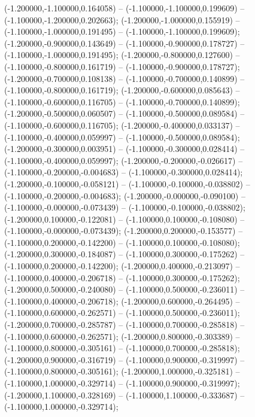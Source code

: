  (-1.200000,-1.100000,0.164058) -- (-1.100000,-1.100000,0.199609) -- (-1.100000,-1.200000,0.202663);
 (-1.200000,-1.000000,0.155919) -- (-1.100000,-1.000000,0.191495) -- (-1.100000,-1.100000,0.199609);
 (-1.200000,-0.900000,0.143649) -- (-1.100000,-0.900000,0.178727) -- (-1.100000,-1.000000,0.191495);
 (-1.200000,-0.800000,0.127600) -- (-1.100000,-0.800000,0.161719) -- (-1.100000,-0.900000,0.178727);
 (-1.200000,-0.700000,0.108138) -- (-1.100000,-0.700000,0.140899) -- (-1.100000,-0.800000,0.161719);
 (-1.200000,-0.600000,0.085643) -- (-1.100000,-0.600000,0.116705) -- (-1.100000,-0.700000,0.140899);
 (-1.200000,-0.500000,0.060507) -- (-1.100000,-0.500000,0.089584) -- (-1.100000,-0.600000,0.116705);
 (-1.200000,-0.400000,0.033137) -- (-1.100000,-0.400000,0.059997) -- (-1.100000,-0.500000,0.089584);
 (-1.200000,-0.300000,0.003951) -- (-1.100000,-0.300000,0.028414) -- (-1.100000,-0.400000,0.059997);
 (-1.200000,-0.200000,-0.026617) -- (-1.100000,-0.200000,-0.004683) -- (-1.100000,-0.300000,0.028414);
 (-1.200000,-0.100000,-0.058121) -- (-1.100000,-0.100000,-0.038802) -- (-1.100000,-0.200000,-0.004683);
 (-1.200000,-0.000000,-0.090100) -- (-1.100000,-0.000000,-0.073439) -- (-1.100000,-0.100000,-0.038802);
 (-1.200000,0.100000,-0.122081) -- (-1.100000,0.100000,-0.108080) -- (-1.100000,-0.000000,-0.073439);
 (-1.200000,0.200000,-0.153577) -- (-1.100000,0.200000,-0.142200) -- (-1.100000,0.100000,-0.108080);
 (-1.200000,0.300000,-0.184087) -- (-1.100000,0.300000,-0.175262) -- (-1.100000,0.200000,-0.142200);
 (-1.200000,0.400000,-0.213097) -- (-1.100000,0.400000,-0.206718) -- (-1.100000,0.300000,-0.175262);
 (-1.200000,0.500000,-0.240080) -- (-1.100000,0.500000,-0.236011) -- (-1.100000,0.400000,-0.206718);
 (-1.200000,0.600000,-0.264495) -- (-1.100000,0.600000,-0.262571) -- (-1.100000,0.500000,-0.236011);
 (-1.200000,0.700000,-0.285787) -- (-1.100000,0.700000,-0.285818) -- (-1.100000,0.600000,-0.262571);
 (-1.200000,0.800000,-0.303389) -- (-1.100000,0.800000,-0.305161) -- (-1.100000,0.700000,-0.285818);
 (-1.200000,0.900000,-0.316719) -- (-1.100000,0.900000,-0.319997) -- (-1.100000,0.800000,-0.305161);
 (-1.200000,1.000000,-0.325181) -- (-1.100000,1.000000,-0.329714) -- (-1.100000,0.900000,-0.319997);
 (-1.200000,1.100000,-0.328169) -- (-1.100000,1.100000,-0.333687) -- (-1.100000,1.000000,-0.329714);

